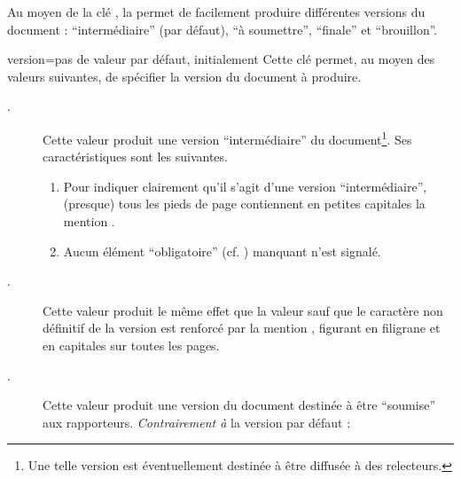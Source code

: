 Au moyen de la clé , la \yatCl{} permet de facilement produire
différentes versions du document : \enquote{intermédiaire} (par défaut),
\enquote{à soumettre}, \enquote{finale} et \enquote{brouillon}.

{
  \begin{docKey}{version}{=\textbar{}\textbar{}\textbar{}\textbar{}\textbar{}}{pas
      de valeur par défaut, initialement }
    Cette clé permet, au moyen des valeurs suivantes, de spécifier la version du
    document à produire.
    \begin{description}
    \item[.]%
      Cette valeur produit une version
      \enquote{intermédiaire} du document\footnote{Une telle version est
        éventuellement destinée à être diffusée à des relecteurs.}. Ses
      caractéristiques sont les suivantes.
      \begin{enumerate}
      \item\label{item:inprogress:1} Pour indiquer clairement qu'il s'agit d'une
        version \enquote{intermédiaire}, (presque) tous les pieds de
        page contiennent en petites capitales la mention
        .
      \item\label{item:inprogress:2} Aucun élément \enquote{obligatoire}
        (cf. ) manquant n'est signalé.
      \end{enumerate}
    \item[.]%
      Cette valeur produit le même effet que la valeur 
      sauf que le caractère non définitif de la version est renforcé par la
      mention , figurant en
      filigrane et en capitales sur toutes les pages.
    \item[.]%
      Cette valeur produit une version du document
      destinée à être \enquote{soumise} aux rapporteurs. \emph{Contrairement à}
      la version par défaut :
      \begin{enumerate}

\end{enumerate}
\end{description}
\end{docKey}}
